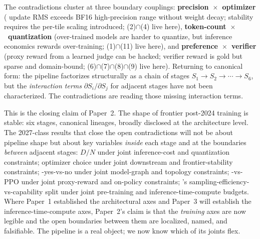 \begin{intuition}
The contradictions cluster at three boundary couplings:
\textbf{precision~$\times$~optimizer} ( update RMS exceeds BF16
high-precision range without weight decay;  stability requires
the per-tile scaling  introduced; (2)$\cap$(4) live here),
\textbf{token-count~$\times$~quantization} (over-trained models are
harder to quantize, but inference economics rewards
over-training; (1)$\cap$(11) live here), and
\textbf{preference~$\times$~verifier} (proxy reward from a learned
judge can be hacked; verifier reward is gold but sparse and
domain-bound; (6)$\cap$(7)$\cap$(8)$\cap$(9) live here). Returning
to canonical form: the pipeline factorizes structurally as a chain of
stages $S_1 \to S_2 \to \cdots \to S_6$, but the
\emph{interaction terms} $\partial S_i / \partial S_j$ for adjacent
stages have not been characterized. The contradictions are reading
those missing interaction terms.
\end{intuition}

This is the closing claim of Paper~2. The shape of frontier
post-2024  training is stable: six stages, canonical lineages,
broadly disclosed at the architecture level. The 2027-class results
that close the open contradictions will not be about pipeline shape
but about key variables \emph{inside} each stage and at the
boundaries \emph{between} adjacent stages: $D / N$ under joint
inference-cost and quantization constraints; optimizer choice under
joint downstream and frontier-stability constraints; -yes-vs-no
under joint model-graph and topology constraints; -vs-PPO under
joint proxy-reward and on-policy constraints; 's
sampling-efficiency-vs-capability split under joint pre-training
and inference-time-compute budgets. Where Paper~1 established the
architectural axes and Paper~3 will establish the
inference-time-compute axes, Paper~2's claim is that the
\emph{training} axes are now legible and the open boundaries between
them are localized, named, and falsifiable. The pipeline is a real
object; we now know which of its joints flex.
